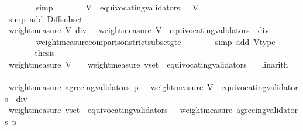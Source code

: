 \begin{isabellebody}
\ \ \ \ \ \ \isamarkupfalse%
\ simp\isanewline
\ \ \ \ \isamarkupfalse%
\ \isamarkupfalse%
\ {\isachardoublequoteopen}V\ {\isacharminus}\ equivocating{\isacharunderscore}validators\ {\isasymsigma}\ {\isasymsubseteq}\ V{\isachardoublequoteclose}\isanewline
\ \ \ \ \ \ \isamarkupfalse%
\ {\isacharparenleft}simp\ add{\isacharcolon}\ Diff{\isacharunderscore}subset{\isacharparenright}\isanewline
\ \ \ \ \isamarkupfalse%
\ \isamarkupfalse%
\ {\isachardoublequoteopen}{\isacharparenleft}weight{\isacharunderscore}measure\ V{\isacharparenright}\ div\ {}\ {\isasymge}\ {\isacharparenleft}weight{\isacharunderscore}measure\ {\isacharparenleft}V\ {\isacharminus}\ equivocating{\isacharunderscore}validators\ {\isasymsigma}{\isacharparenright}{\isacharparenright}\ div\ {}{\isachardoublequoteclose}\ \isanewline
\ \ \ \ \ \ \isamarkupfalse%
\ weight{\isacharunderscore}measure{\isacharunderscore}comparison{\isacharunderscore}strict{\isacharunderscore}subset{\isacharunderscore}gte\isanewline
\ \ \ \ \ \ \isamarkupfalse%
\ {\isacharparenleft}simp\ add{\isacharcolon}\ V{\isacharunderscore}type{\isacharparenright}\ \ \isanewline
\ \ \ \ \isamarkupfalse%
\ \isamarkupfalse%
\ {\isacharquery}thesis\isanewline
\ \ \ \ \ \ \isamarkupfalse%
\ {\isacartoucheopen}weight{\isacharunderscore}measure\ V\ {\isacharslash}\ {}\ {\isacharless}\ weight{\isacharunderscore}measure\ {\isacharparenleft}v{\isacharunderscore}set\ {\isacharminus}\ equivocating{\isacharunderscore}validators\ {\isasymsigma}{\isacharparenright}{\isacartoucheclose}\ \isamarkupfalse%
\ linarith\isanewline
\ \ \isamarkupfalse%
\isanewline
\ \ \isamarkupfalse%
\ \isamarkupfalse%
\ {\isachardoublequoteopen}weight{\isacharunderscore}measure\ {\isacharparenleft}agreeing{\isacharunderscore}validators\ {\isacharparenleft}p{\isacharcomma}\ {\isasymsigma}{\isacharparenright}{\isacharparenright}\ {\isachargreater}\ weight{\isacharunderscore}measure\ {\isacharparenleft}V\ {\isacharminus}\ equivocating{\isacharunderscore}validators\ {\isasymsigma}{\isacharparenright}\ div\ {}{\isachardoublequoteclose}\ \isanewline
\ \ \ \ \isamarkupfalse%
\ {\isacartoucheopen}weight{\isacharunderscore}measure\ {\isacharparenleft}v{\isacharunderscore}set\ {\isacharminus}\ equivocating{\isacharunderscore}validators\ {\isasymsigma}{\isacharparenright}\ {\isasymle}\ weight{\isacharunderscore}measure\ {\isacharparenleft}agreeing{\isacharunderscore}validators\ {\isacharparenleft}p{\isacharcomma}\ {\isasymsigma}{\isacharparenright}{\isacharparenright}{\isacartoucheclose}\isanewline

\end{isabellebody}
